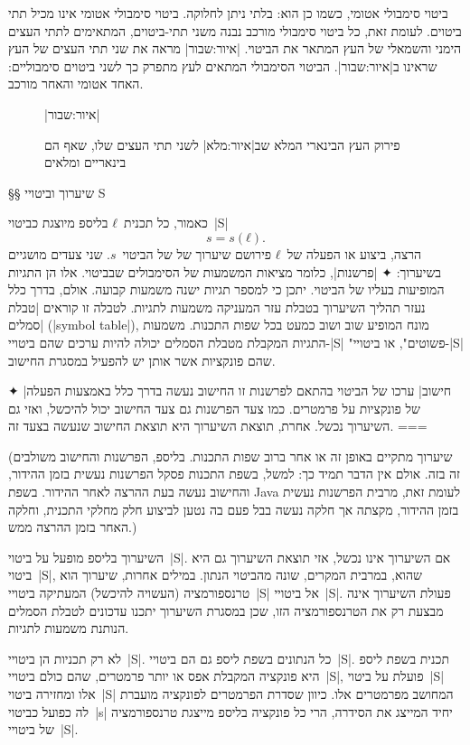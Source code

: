 ביטוי סימבולי אטומי, כשמו כן הוא: בלתי ניתן לחלוקה. ביטוי סימבולי אטומי אינו
מכיל תתי ביטוים. לעומת זאת, כל ביטוי סימבולי מורכב נבנה משני תתי-ביטוים,
המתאימים לתתי העצים הימני והשמאלי של העץ המתאר את הביטוי. |איור:שבור| מראה
את שני תתי העצים של העץ שראינו ב|איור:שבור|. הביטוי הסימבולי המתאים לעץ
מתפרק כך לשני ביטוים סימבוליים: האחד אטומי והאחר מורכב.

\begin{figure}[H]
\caption[פירוק עץ בינארי לשני תתי עצים]{פירוק העץ הבינארי המלא שב|איור:מלא|
      לשני תתי העצים שלו, שאף הם בינאריים ומלאים}
|איור:שבור|
  \scriptsize
  \center
  
\end{figure}

§§ שיערוך וביטויי S

כאמור, כל תכנית~$ℓ$ בליספ מיוצגת כביטוי~\E|S| \[
  s=s(ℓ).
\] הרצה, ביצוע או הפעלה של~$ℓ$ פירושם שיערוך של של הביטוי~$s$. שני צעדים
מושגיים בשיערוך:
✦ \ע|פרשנות|, כלומר מציאות המשמעות של הסימבולים שבביטוי. אלו הן התגיות המופיעות
בעליו של הביטוי. יתכן כי למספר תגיות ישנה משמעות קבועה. אולם, בדרך כלל נעזר
תהליך השיערוך בטבלת עזר המעניקה משמעות לתגיות. לטבלה זו קוראים \ע|טבלת סמלים|
(\E|symbol table|), מונח המופיע שוב ושוב כמעט בכל שפות התכנות. משמעות התגיות
המקבלת מטבלת הסמלים יכולה להיות ערכים שהם ביטויי-\E|S| "פשוטים", או
ביטויי-\E|S| שהם פונקציות אשר אותן יש להפעיל במסגרת החישוב.

✦ \ע|חישוב| ערכו של הביטוי בהתאם לפרשנות זו החישוב נעשה בדרך כלל באמצעות הפעלה
של פונקציות על פרמטרים. כמו צעד הפרשנות גם צעד החישוב יכול להיכשל, ואזי גם
השיערוך נכשל. אחרת, תוצאת השיערוך היא תוצאת החישוב שנעשה בצעד זה.
===

(שיערוך מתקיים באופן זה או אחר ברוב שפות התכנות. בליספ, הפרשנות והחישוב
משולבים זה בזה. אולם אין הדבר תמיד כך: למשל, בשפת התכנות פסקל הפרשנות נעשית
בזמן ההידור, והחישוב נעשה בעת ההרצה לאחר ההידור. בשפת Java לעומת זאת, מרבית
הפרשנות נעשית בזמן ההידור, מקצתה אך חלקה נעשה בבל פעם בה נטען לביצוע חלק מחלקי
התכנית, וחלקה האחר בזמן ההרצה ממש.)

השיערוך בליספ מופעל על ביטוי~\E|S|. אם השיערוך אינו נכשל, אזי תוצאת השיערוך גם
היא ביטוי~\E|S|, שהוא, במרבית המקרים, שונה מהביטוי הנתון. במילים אחרות, שיערוך
הוא טרנספורמציה (העשויה להיכשל) המעתיקה ביטויי~\E|S| אל ביטויי~\E|S|. פעולת
השיערוך אינה מבצעת רק את הטרנספורמציה הזו, שכן במסגרת השיערוך יתכנו עדכונים
לטבלת הסמלים הנותנת משמעות לתגיות.

לא רק תכניות הן ביטויי~\E|S|. כל הנתונים בשפת ליספ גם הם ביטויי~\E|S|. תכנית
בשפת ליספ היא פונקציה המקבלת אפס או יותר פרמטרים, שהם כולם ביטויי~\E|S|, פועלת
על ביטוי~\E|S| אלו ומחזירה ביטוי~\E|S| המחושב מפרמטרים אלו. כיוון שסדרת
הפרמטרים לפונקציה מועברת לה כפועל כביטוי~\E|s| יחיד המייצג את הסידרה, הרי כל
פונקציה בליספ מייצגת טרנספורמציה של ביטויי~\E|S|.

